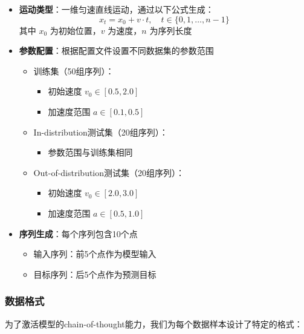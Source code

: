 \documentclass[a4paper, 12pt]{article}
\begin{document}
\begin{itemize}
    \item \textbf{运动类型}：一维匀速直线运动，通过以下公式生成：
        \begin{equation}
            x_t = x_0 + v \cdot t, \quad t \in \{0,1,\ldots,n-1\}
        \end{equation}
        其中 $x_0$ 为初始位置，$v$ 为速度，$n$ 为序列长度
    
    \item \textbf{参数配置}：根据配置文件设置不同数据集的参数范围
        \begin{itemize}
            \item 训练集（50组序列）：
                \begin{itemize}
                    \item 初始速度 $v_0 \in [0.5, 2.0]$
                    \item 加速度范围 $a \in [0.1, 0.5]$
                \end{itemize}
            \item In-distribution测试集（20组序列）：
                \begin{itemize}
                    \item 参数范围与训练集相同
                \end{itemize}
            \item Out-of-distribution测试集（20组序列）：
                \begin{itemize}
                    \item 初始速度 $v_0 \in [2.0, 3.0]$
                    \item 加速度范围 $a \in [0.5, 1.0]$
                \end{itemize}
        \end{itemize}
    
    \item \textbf{序列生成}：每个序列包含10个点
        \begin{itemize}
            \item 输入序列：前5个点作为模型输入
            \item 目标序列：后5个点作为预测目标
        \end{itemize}
\end{itemize}

\subsubsection{数据格式}
为了激活模型的chain-of-thought能力，我们为每个数据样本设计了特定的格式：
\end{document}
